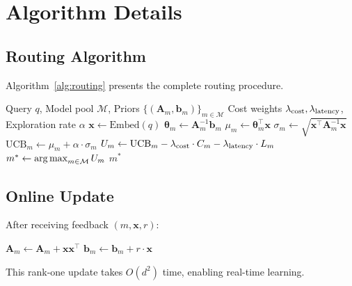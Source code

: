 \section{Algorithm Details}
\label{app:algorithm}

\subsection{Routing Algorithm}

Algorithm~\ref{alg:routing} presents the complete routing procedure.

\begin{algorithm}[h]
\caption{Density-Based Warm-Start Routing}
\label{alg:routing}
\begin{algorithmic}[1]
\REQUIRE Query $q$, Model pool $\mathcal{M}$, Priors $\{(\mathbf{A}_m, \mathbf{b}_m)\}_{m \in \mathcal{M}}$
\REQUIRE Cost weights $\lambda_{\text{cost}}, \lambda_{\text{latency}}$, Exploration rate $\alpha$
\STATE $\mathbf{x} \leftarrow \text{Embed}(q)$ 
    \STATE $\boldsymbol{\theta}_m \leftarrow \mathbf{A}_m^{-1} \mathbf{b}_m$ 
    \STATE $\mu_m \leftarrow \boldsymbol{\theta}_m^\top \mathbf{x}$ 
    \STATE $\sigma_m \leftarrow \sqrt{\mathbf{x}^\top \mathbf{A}_m^{-1} \mathbf{x}}$ 
    \STATE $\text{UCB}_m \leftarrow \mu_m + \alpha \cdot \sigma_m$ 
    \STATE $U_m \leftarrow \text{UCB}_m - \lambda_{\text{cost}} \cdot C_m - \lambda_{\text{latency}} \cdot L_m$ 
\ENDFOR
\STATE $m^* \leftarrow \operatorname*{arg\,max}_{m \in \mathcal{M}} U_m$
\RETURN $m^*$
\end{algorithmic}
\end{algorithm}

\subsection{Online Update}

After receiving feedback $(m, \mathbf{x}, r)$:

\begin{algorithmic}[1]
\STATE $\mathbf{A}_m \leftarrow \mathbf{A}_m + \mathbf{x}\mathbf{x}^\top$ 
\STATE $\mathbf{b}_m \leftarrow \mathbf{b}_m + r \cdot \mathbf{x}$ 
\end{algorithmic}

This rank-one update takes $O(d^2)$ time, enabling real-time learning.

